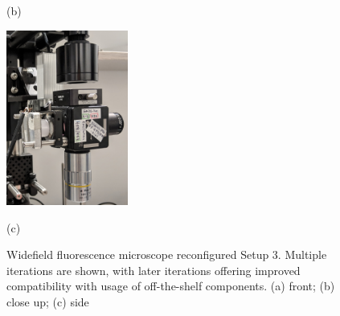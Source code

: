 \begin{figure}[htb]
\begin{minipage}[t]{0.32\linewidth}
        \centerline{(b)}
  \end{minipage}
  \begin{minipage}[t]{0.32\linewidth}\centering
    \includegraphics[width=4cm]{2_Body/Figures/setup4-closeup.jpg}
    \centerline{(c)}
  \end{minipage}
  \caption{Widefield fluorescence microscope reconfigured Setup 3. Multiple iterations are
shown, with later iterations offering improved compatibility with usage
of off-the-shelf components. (a) front; (b) close up; (c) side}
  \label{fig:motion sensors}
\end{figure}








\clearpage

